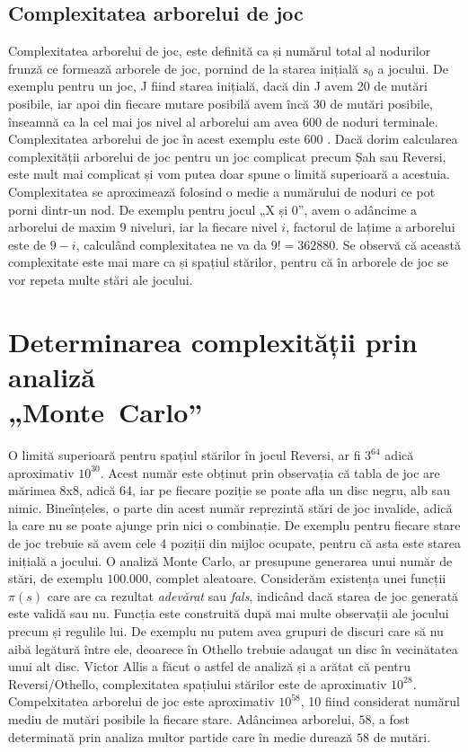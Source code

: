 \documentclass[12pt,twoside,a4paper,fleqn]{book}
\begin{document}
\subsection{Complexitatea arborelui de joc}
Complexitatea arborelui de joc, este definită ca și numărul total al nodurilor frunză ce formează arborele de joc, pornind de la starea inițială $s_{0}$ a jocului. De exemplu pentru un joc, J fiind starea inițială, dacă din J avem 20 de mutări posibile, iar apoi din fiecare mutare posibilă avem încă 30 de mutări posibile, înseamnă ca la cel mai jos nivel al arborelui am avea 600 de noduri terminale. Complexitatea arborelui de joc în acest exemplu este 600 \cite{allis}. Dacă dorim calcularea complexității arborelui de joc pentru un joc complicat precum Șah sau Reversi, este mult mai complicat și vom putea doar spune o limită superioară a acestuia. Complexitatea se aproximează folosind o medie a numărului de noduri ce pot porni dintr-un nod. De exemplu pentru jocul „X și 0”, avem o adâncime a arborelui de maxim 9 niveluri, iar la fiecare nivel $i$, factorul de lațime a arborelui este de $9 - i$, calculând complexitatea ne va da $9! = 362880$. Se observă că această complexitate este mai mare ca și spațiul stărilor, pentru că în arborele de joc se vor repeta multe stări ale jocului.

\section{Determinarea complexității prin analiză\\ \hbox{„Monte Carlo”}}
O limită superioară pentru spațiul stărilor în jocul Reversi, ar fi $3^{64}$ adică aproximativ $10^{30}$. Acest număr este obținut prin observația că tabla de joc are mărimea 8x8, adică 64, iar pe fiecare poziție se poate afla un disc negru, alb sau nimic. Bineînțeles, o parte din acest număr reprezintă stări de joc invalide, adică la care nu se poate ajunge prin nici o combinație. De exemplu pentru fiecare stare de joc trebuie să avem cele 4 poziții din mijloc ocupate, pentru că asta este starea inițială a jocului. O analiză Monte Carlo, ar presupune generarea unui număr de stări, de exemplu $100.000$, complet aleatoare. Considerăm existența unei funcții $\pi(s)$ care are ca rezultat \emph{adevărat} sau \emph{fals}, indicând dacă starea de joc generată este validă sau nu. Funcția este construită după mai multe observații ale jocului precum și regulile lui. De exemplu nu putem avea grupuri de discuri care să nu aibă legătură între ele, deoarece în Othello trebuie adaugat un disc în vecinătatea unui alt disc. Victor Allis \cite{allis} a făcut o astfel de analiză și a arătat că pentru Reversi/Othello, complexitatea spațiului stărilor este de aproximativ $10^{28}$.\\
Compelxitatea arborelui de joc este aproximativ $10^{58}$, 10 fiind considerat numărul mediu de mutări posibile la fiecare stare. Adâncimea arborelui, $58$, a fost determinată prin analiza multor partide care în medie durează $58$ de mutări. \cite{allis}
\end{document}
